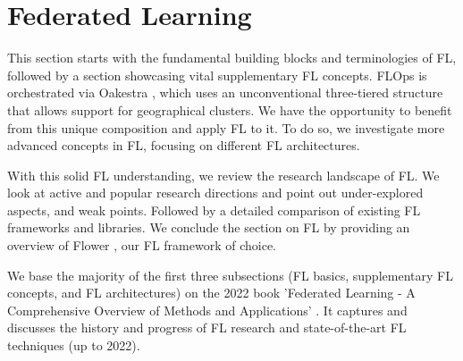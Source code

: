 \section{Federated Learning}\label{section:federated_learning}

This section starts with the fundamental building blocks and terminologies of FL,
followed by a section showcasing vital supplementary FL concepts.
FLOps is orchestrated via Oakestra \cite{paper:oakestra_usenix}, which uses an unconventional
three-tiered structure that allows support for geographical clusters.
We have the opportunity to benefit from this unique composition and apply FL to it.
To do so, we investigate more advanced concepts in FL, focusing on different FL architectures.

With this solid FL understanding, we review the research landscape of FL.
We look at active and popular research directions and point out under-explored aspects,
and weak points.
Followed by a detailed comparison of existing FL frameworks and libraries.
We conclude the section on FL by providing an overview of Flower \cite{flower_docs}, our FL framework of choice.

We base the majority of the first three subsections
(FL basics, supplementary FL concepts, and FL architectures) on the 2022 book
'Federated Learning - A Comprehensive Overview of Methods and Applications' \cite{book:fl}.
It captures and discusses the history and progress of FL research and state-of-the-art FL techniques (up to 2022).






